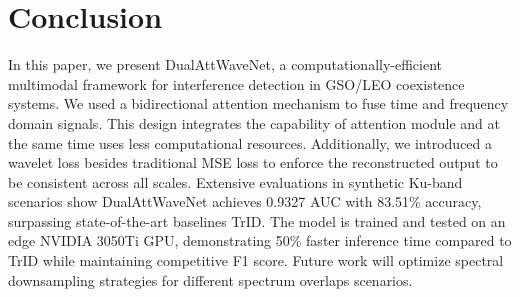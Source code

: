 \documentclass[conference]{IEEEtran}
\begin{document}
\section{Conclusion}
\label{sec:conclusion}

In this paper, we present DualAttWaveNet, a computationally-efficient multimodal framework for interference detection in GSO/LEO coexistence systems. We used a bidirectional attention mechanism to fuse time and frequency domain signals. This design integrates the capability of attention module and at the same time uses less computational resources. Additionally, we introduced a wavelet loss besides traditional MSE loss to enforce the reconstructed output to be consistent across all scales. Extensive evaluations in synthetic Ku-band scenarios show DualAttWaveNet achieves 0.9327 AUC with 83.51\% accuracy, surpassing state-of-the-art baselines TrID. The model is trained and tested on an edge NVIDIA 3050Ti GPU, demonstrating 50\% faster inference time compared to TrID while maintaining competitive F1 score. Future work will optimize spectral downsampling strategies for different spectrum overlaps scenarios.



\end{document}
